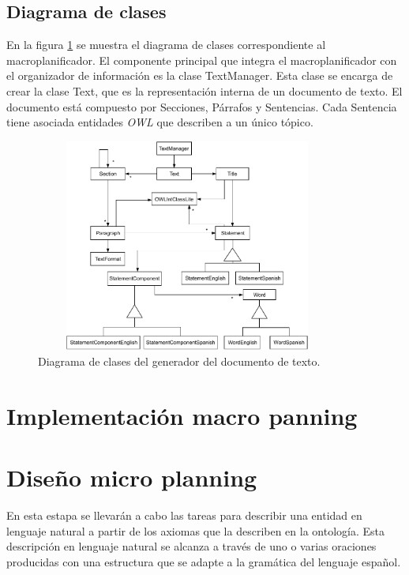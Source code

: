\subsection{Diagrama de clases}
En la figura \ref{fig:diagrama_clases_macroplanificador} se muestra el diagrama de clases correspondiente al macroplanificador. El componente principal que integra el macroplanificador con el organizador de información es la clase TextManager. Esta clase se encarga de crear la clase Text, que es la representación interna de un documento de texto. El documento está compuesto por Secciones, Párrafos y Sentencias. Cada Sentencia tiene asociada entidades \emph{OWL} que describen a un único tópico.

\begin{figure}[H]
    \centering
    \includegraphics[width=10cm, height=7cm]{img/generacion_documento/diagrama_clases_macroplanificador.pdf}
    \caption{Diagrama de clases del generador del documento de texto.}
    \label{fig:diagrama_clases_macroplanificador}
\end{figure}

\section{Implementación macro panning}

\section{Diseño micro planning}
En esta estapa se llevarán a cabo las tareas para describir una entidad en lenguaje natural a partir de los axiomas que la describen en la ontología. Esta descripción en lenguaje natural se alcanza a través de uno o varias oraciones producidas con una estructura que se adapte a la gramática del lenguaje español.

